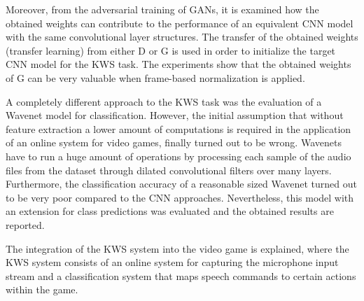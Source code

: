 Moreover, from the adversarial training of GANs, it is examined how the obtained weights can contribute to the performance of an equivalent CNN model with the same convolutional layer structures.
The transfer of the obtained weights (transfer learning) from either D or G is used in order to initialize the target CNN model for the KWS task.
The experiments show that the obtained weights of G can be very valuable when frame-based normalization is applied.

A completely different approach to the KWS task was the evaluation of a Wavenet \cite{Oord2016Wavenet} model for classification.
However, the initial assumption that without feature extraction a lower amount of computations is required in the application of an online system for video games, finally turned out to be wrong.
Wavenets have to run a huge amount of operations by processing each sample of the audio files from the dataset through dilated convolutional filters over many layers.
Furthermore, the classification accuracy of a reasonable sized Wavenet turned out to be very poor compared to the CNN approaches.
Nevertheless, this model with an extension for class predictions was evaluated and the obtained results are reported.

The integration of the KWS system into the video game is explained, where the KWS system consists of an online system for capturing the microphone input stream and a classification system that maps speech commands to certain actions within the game.